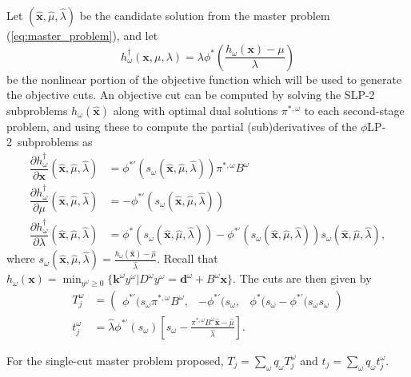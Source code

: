 \documentclass[ijoc,letterpaper]{informs3} %
\newcommand{\x}{\mathbf{x}}
\newcommand{\xh}{\hat{\x}}
\newcommand{\lh}{\hat{\lambda}}
\newcommand{\mh}{\hat{\mu}}
\renewcommand{\k}{\mathbf{k}}
\renewcommand{\d}{\mathbf{d}}
\newcommand{\plp}{$\phi$LP-2}
\begin{document}
Let $(\xh,\mh, \lh)$ be the candidate solution from the master problem (\ref{eq:master_problem}), and let 
\[
	h^\dagger_\omega(\x,\mu,\lambda) = \lambda \phi^*\left(\frac{h_\omega(\x) - \mu}{\lambda}\right)
\]
be the nonlinear portion of the objective function which will be used to generate the objective cuts.
An objective cut can be computed by solving the SLP-2 subproblems $h_\omega(\xh)$ along with optimal dual solutions $\pi^{*,\omega}$ to each second-stage problem, and using these to compute the partial (sub)derivatives of the \plp\ subproblems as
\begin{align*}
	\dfrac{\partial h^\dagger_\omega}{\partial \x}(\xh,\mh,\lh) & = \phi^{*\prime}(s_\omega(\xh,\mh,\lh)) \pi^{*,\omega}B^\omega \\
	\dfrac{\partial h^\dagger_\omega}{\partial \mu}(\xh,\mh,\lh) & = -\phi^{*\prime}(s_\omega(\xh,\mh,\lh)) \\
	\dfrac{\partial h^\dagger_\omega}{\partial \lambda}(\xh,\mh,\lh) & = \phi^*(s_\omega(\xh,\mh,\lh)) - \phi^{*\prime}(s_\omega(\xh,\mh,\lh))s_\omega(\xh,\mh,\lh),
\end{align*}
where $s_\omega(\xh,\mh,\lh) = \frac{h_\omega(\xh) - \mh}{\lh}$.
Recall that $h_\omega(\x) = \min_{y^\omega \geq 0} \{\k^\omega y^\omega | D^\omega y^\omega = \d^\omega + B^\omega \x\}$.
The cuts are then given by
\begin{align*}
	T_j^\omega & = 
	\left( \begin{array}{ccc}
		\phi^{*\prime}(s_\omega \pi^{*,\omega}B^\omega, 
			 & -\phi^{*\prime}(s_\omega, 
			 & \phi^*(s_\omega - \phi^{*\prime}(s_\omega s_\omega
	\end{array} \right) \\
	t_j^\omega & = \lh \phi^{*\prime}(s_\omega)\left[s_\omega - \frac{\pi^{*,\omega}B^\omega\xh - \mh}{\lh}\right].
\end{align*}

For the single-cut master problem proposed, $T_j = \sum_\omega q_\omega T_j^\omega$ and $t_j = \sum_\omega q_\omega t_j^\omega$.
\end{document}
